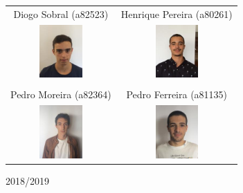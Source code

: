 \begin{titlepage}
\begin{table}[!htbp]
\centering
\begin{tabular}{cc}
 Diogo Sobral (a82523) &  Henrique Pereira (a80261) \\
 \includegraphics[height=0.8in]{fotoscap/Diogo.jpg} &  \includegraphics[height=0.8in]{fotoscap/Henrique.jpg} \\
	& \\
 Pedro Moreira (a82364)  &   Pedro Ferreira (a81135) \\
 \includegraphics[height=0.8in]{fotoscap/PedroM.jpg} & \includegraphics[height=0.8in]{fotoscap/PedroF.jpg} \\

\end{tabular}
\end{table}

{\large 2018/2019}\\[2cm] %

\vfill %
\end{titlepage}